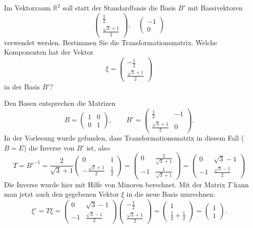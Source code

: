 Im Vektorraum $\mathbb R^2$ soll statt der Standardbasis die Basis $B'$ mit
Bassivektoren
\[
\begin{pmatrix}
\frac12\\
\frac{\sqrt{3}+1}2
\end{pmatrix},\quad
\begin{pmatrix}
-1\\
0
\end{pmatrix}
\]
verwendet werden.
Bestimmen Sie die Transformationsmatrix.
Welche Komponenten hat der Vektor
\[
\xi=
\begin{pmatrix}
-\frac12\\
\frac{\sqrt{3}+1}2
\end{pmatrix}
\]
in der Basis $B'$?

\begin{loesung}
Den Basen entsprechen die Matrizen
\[
B=\begin{pmatrix}1&0\\0&1\end{pmatrix},\qquad
B'=\begin{pmatrix}
\frac12&-1\\
\frac{\sqrt{3}+1}2&0
\end{pmatrix}.
\]
In der Vorlesung wurde gefunden, dass Transformationsmatrix in diesem
Fall ($B=E$) die Inverse von $B'$ ist, also
\[
T=B'^{-1}=\frac2{\sqrt{3}+1}\begin{pmatrix}
0&1\\
-\frac{\sqrt{3}+1}2&\frac12
\end{pmatrix}
=\begin{pmatrix}
0&\frac{2}{\sqrt{3}+1}\\
-1&\frac1{\sqrt{3}+1}
\end{pmatrix}
=
\begin{pmatrix}
0&\sqrt{3}-1\\
-1&\frac{\sqrt{3}-1}{2}
\end{pmatrix}
\]
Die Inverse wurde hier mit Hilfe von Minoren berechnet.
Mit der Matrix $T$ kann man jetzt auch den gegebenen Vektor $\xi$  in
die neue Basis umrechnen:
\[
\xi'=
T\xi
=
\begin{pmatrix}
0&\sqrt{3}-1\\
-1&\frac{\sqrt{3}-1}{2}
\end{pmatrix}
\begin{pmatrix}
-\frac12\\
\frac{\sqrt{3}+1}2
\end{pmatrix}
=
\begin{pmatrix}1\\
\frac12+\frac12\end{pmatrix}
=\begin{pmatrix}1\\1\end{pmatrix}.
\]
\end{loesung}

